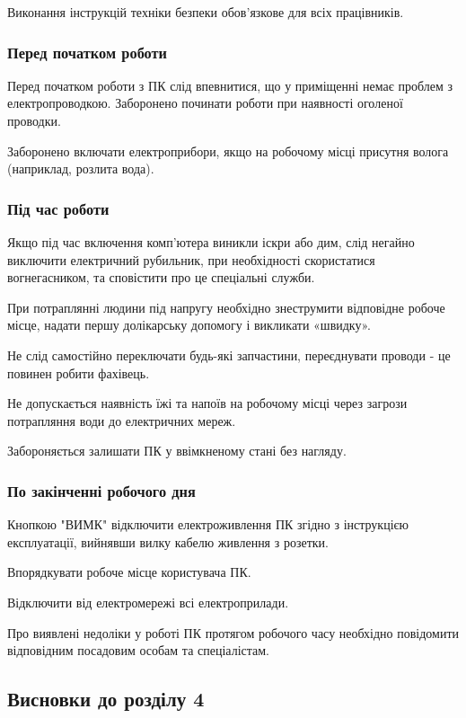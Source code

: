     Виконання інструкцій техніки безпеки обов'язкове для всіх працівників.

    \subsubsection{Перед початком роботи}

    Перед початком роботи з ПК слід впевнитися, що у приміщенні немає проблем з електропроводкою. Заборонено починати роботи при наявності оголеної проводки.
    
    Заборонено включати електроприбори, якщо на робочому місці присутня волога (наприклад, розлита вода).
    
    \subsubsection{Під час роботи}
    Якщо під час включення комп'ютера виникли іскри або дим, слід негайно виключити електричний рубильник,
    при необхідності скористатися вогнегасником, та сповістити про це спеціальні служби.

    При потраплянні людини під напругу необхідно знеструмити відповідне робоче місце, надати першу долікарську допомогу і викликати «швидку».

    Не слід самостійно переключати будь-які запчастини, переєднувати проводи - це повинен робити фахівець.

    Не допускається наявність їжі та напоїв на робочому місці через загрози потрапляння води до електричних мереж.

    Забороняється залишати ПК у ввімкненому стані без нагляду.

    \subsubsection{По закінченні робочого дня}
    Кнопкою "ВИМК" відключити електроживлення ПК згідно з інструкцією експлуатації, вийнявши вилку кабелю живлення з розетки.

    Впорядкувати робоче місце користувача ПК.

    Відключити від електромережі всі електроприлади.

    Про виявлені недоліки у роботі ПК протягом робочого часу необхідно повідомити відповідним посадовим
    особам та спеціалістам.

\subsection{Висновки до розділу 4}

